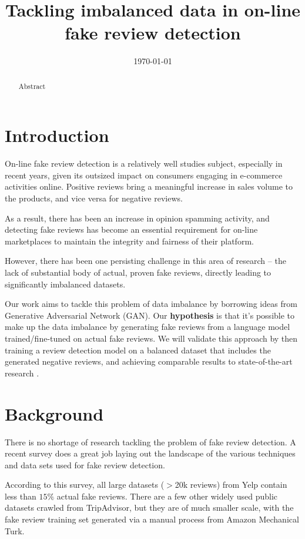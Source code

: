 \documentclass[conference]{IEEEtran} %
\title{Tackling imbalanced data in on-line fake review detection}
\date{\today}
\author{\IEEEauthorblockN{Satheesh Joseph}
\and
\IEEEauthorblockN{Catherine Mou}
\and
\IEEEauthorblockN{Yi Zhang}
}
\theoremstyle{plain}
\theoremstyle{definition}
\begin{document}
\maketitle



\begin{abstract}
Abstract
\end{abstract}

\section{Introduction}
\label{intro}
On-line fake review detection is a relatively well studies subject, especially in recent years, given its outsized impact on consumers engaging in e-commerce activities online. Positive reviews bring a meaningful increase in sales volume to the products\cite{ho2013effects}, and vice versa for negative reviews.

As a result, there has been an increase in opinion spamming activity, and detecting fake reviews has become an essential requirement for on-line marketplaces to maintain the integrity and fairness of their platform.

However, there has been one persisting challenge \cite{stanton2019gans, Tang2020, wang2020fake, yuan2019learning} in this area of research -- the lack of substantial body of actual, proven fake reviews, directly leading to significantly imbalanced datasets.

Our work aims to tackle this problem of data imbalance by borrowing ideas from Generative Adversarial Network (GAN). Our \textbf{hypothesis} is that it's possible to make up the data imbalance by generating fake reviews from a language model trained/fine-tuned on actual fake reviews. We will validate this approach by then training a review detection model on a balanced dataset that includes the generated negative reviews, and achieving comparable results to state-of-the-art research \cite{Tang2020}.


\section{Background}
\label{bg}
There is no shortage of research tackling the problem of fake review detection. A recent survey \cite{Mohawesh2021} does a great job laying out the landscape of the various techniques and data sets used for fake review detection.

According to this survey, all large datasets ($>$20k reviews) from Yelp \cite{rayana2015collective} contain less than $15\%$ actual fake reviews. There are a few other widely used public datasets crawled from TripAdvisor, but they are of much smaller scale, with the fake review training set generated via a manual process from Amazon Mechanical Turk.
\end{document}
